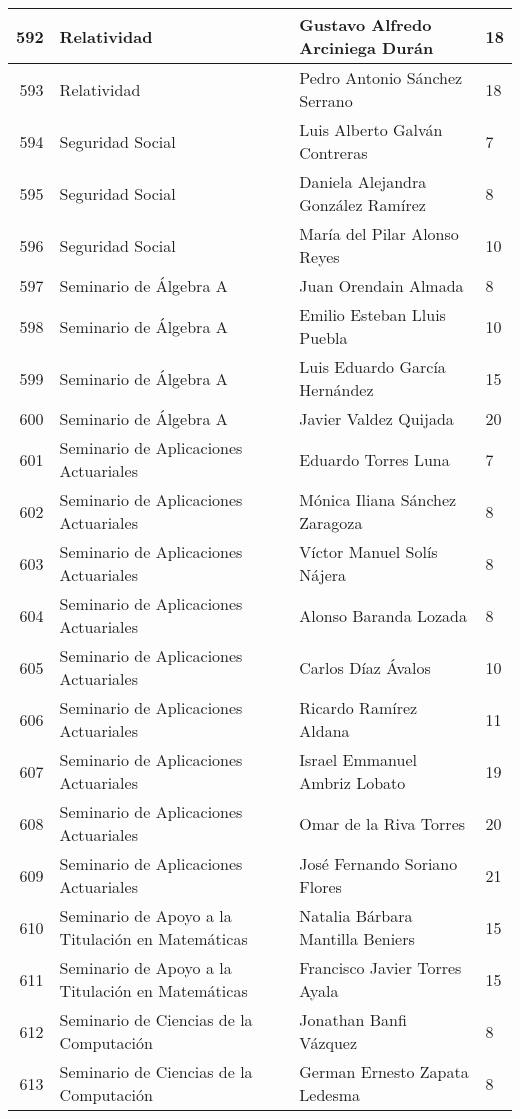 \begin{table}[ht]
\begin{tabular}{rlll}
  592 & Relatividad & Gustavo Alfredo Arciniega Durán & 18 \\ \hline
  593 & Relatividad & Pedro Antonio Sánchez Serrano & 18 \\ \hline
  594 & Seguridad Social & Luis Alberto Galván Contreras & 7 \\ \hline
  595 & Seguridad Social & Daniela Alejandra González Ramírez & 8 \\ \hline
  596 & Seguridad Social & María del Pilar Alonso Reyes & 10 \\ \hline
  597 & Seminario de Álgebra A & Juan Orendain Almada & 8 \\ \hline
  598 & Seminario de Álgebra A & Emilio Esteban Lluis Puebla & 10 \\ \hline
  599 & Seminario de Álgebra A & Luis Eduardo García Hernández & 15 \\ \hline
  600 & Seminario de Álgebra A & Javier Valdez Quijada & 20 \\ \hline
  601 & Seminario de Aplicaciones Actuariales & Eduardo Torres Luna & 7 \\ \hline
  602 & Seminario de Aplicaciones Actuariales & Mónica Iliana Sánchez Zaragoza & 8 \\ \hline
  603 & Seminario de Aplicaciones Actuariales & Víctor Manuel Solís Nájera & 8 \\ \hline
  604 & Seminario de Aplicaciones Actuariales & Alonso Baranda Lozada & 8 \\ \hline
  605 & Seminario de Aplicaciones Actuariales & Carlos Díaz Ávalos & 10 \\ \hline
  606 & Seminario de Aplicaciones Actuariales & Ricardo Ramírez Aldana & 11 \\ \hline
  607 & Seminario de Aplicaciones Actuariales & Israel Emmanuel Ambriz Lobato & 19 \\ \hline
  608 & Seminario de Aplicaciones Actuariales & Omar de la Riva Torres & 20 \\ \hline
  609 & Seminario de Aplicaciones Actuariales & José Fernando Soriano Flores & 21 \\ \hline
  610 & Seminario de Apoyo a la Titulación en Matemáticas & Natalia Bárbara Mantilla Beniers & 15 \\ \hline
  611 & Seminario de Apoyo a la Titulación en Matemáticas & Francisco Javier Torres Ayala & 15 \\ \hline
  612 & Seminario de Ciencias de la Computación & Jonathan Banfi Vázquez & 8 \\ \hline
  613 & Seminario de Ciencias de la Computación & German Ernesto Zapata Ledesma & 8 \\ \hline

\end{tabular}
\end{table}
